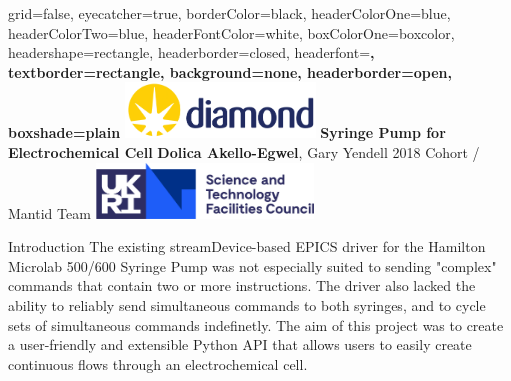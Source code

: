 \documentclass[a0paper,landscape]{baposter}
\begin{document}

\background{}

\begin{poster}{
	grid=false,
	eyecatcher=true, 
	borderColor=black,
	headerColorOne=blue,
	headerColorTwo=blue,
	headerFontColor=white,
	boxColorOne=boxcolor,
	headershape=rectangle,
	headerborder=closed,
	headerfont=\Large\sf\bf,
	textborder=rectangle,
	background=none,
	headerborder=open,
    boxshade=plain
}
{\includegraphics[height=4em]{images/diamondlogo}} 
{\bf Syringe Pump for Electrochemical Cell \vspace{0.5em}} %
{\textbf{Dolica Akello-Egwel}, Gary Yendell \hspace{12pt} 2018 Cohort / Mantid Team} %
{\includegraphics[height=4em]{images/stfclogo}} 

\begin{posterbox}[name=introduction,column=0]{Introduction}
The existing streamDevice-based EPICS driver for the Hamilton Microlab 500/600 Syringe Pump was not
especially suited to sending "complex" commands that contain two or more instructions.
The driver also lacked the ability to reliably send simultaneous commands to both syringes, and to
cycle sets of simultaneous commands indefinetly. The aim of this project was to create a user-friendly
and extensible Python API that allows users to easily create continuous flows through an electrochemical
cell.
\end{posterbox}


\end{poster}
\end{document}
